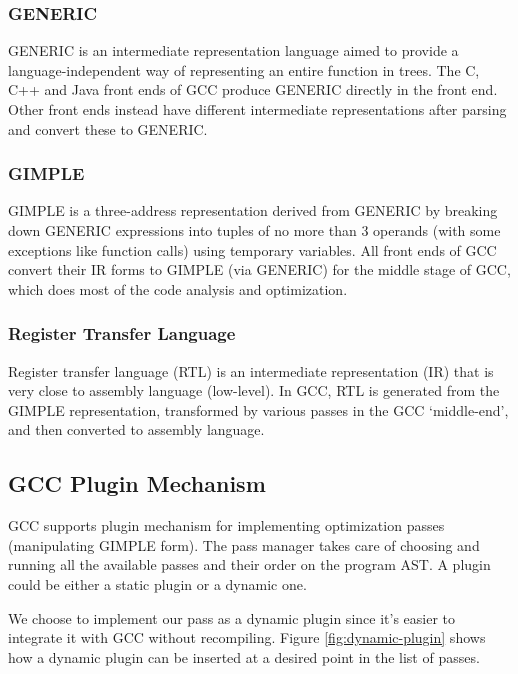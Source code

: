 \subsubsection{GENERIC}
GENERIC\cite{generic} is an intermediate representation language aimed to provide a language-independent way of representing an entire function in trees. The C, C++ and Java front ends of GCC produce GENERIC directly in the front end. Other front ends instead have different intermediate representations after parsing and convert these to GENERIC.
\subsubsection{GIMPLE}
GIMPLE\cite{gimple} is a three-address representation derived from GENERIC by breaking down GENERIC expressions into tuples of no more than 3 operands (with some exceptions like function calls) using temporary variables. All front ends of GCC convert their IR forms to GIMPLE (via GENERIC) for the middle stage of GCC, which does most of the code analysis and optimization.
\subsubsection{Register Transfer Language}
Register transfer language (RTL)\cite{rtl} is an intermediate representation (IR) that is very close to assembly language (low-level). In GCC, RTL is generated from the GIMPLE representation, transformed by various passes in the GCC `middle-end', and then converted to assembly language.

\subsection{GCC Plugin Mechanism}
GCC supports plugin mechanism for implementing optimization passes (manipulating GIMPLE form). The pass manager takes care of choosing and running all the available passes and their order on the program AST. A plugin could be either a static plugin or a dynamic one.

We choose to implement our pass as a dynamic plugin since it's easier to integrate it with GCC without recompiling. Figure \ref{fig:dynamic-plugin} shows how a dynamic plugin can be inserted at a desired point in the list of passes.

